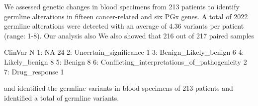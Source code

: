 We assessed genetic changes in blood specimens from 213 patients to identify germline alterations in fifteen cancer-related and six PGx genes. A total of 2022 germline alterations were detected with an average of 4.36 variants per patient (range: 1-8). Our analysis also We also showed that 216 out of 217 paired samples 

ClinVar  N
1:                                           NA 24
2:                       Uncertain_significance  1
3:                         Benign_Likely_benign  6
4:                                Likely_benign  8
5:                                       Benign  8
6: Conflicting_interpretations_of_pathogenicity  2
7:                                Drug_response  1

and identified the germline variants in blood specimens of 213 patients and identified a total of  germline variants.





